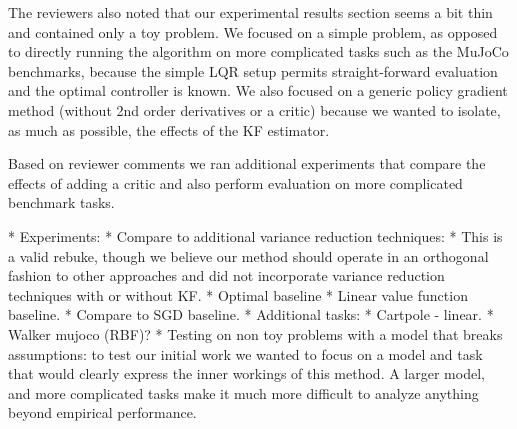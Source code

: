 \documentclass{article}
\begin{document}
		The reviewers also noted that our experimental results section seems a bit thin and contained only a toy problem. 
		We focused on a simple problem, as opposed to directly running the algorithm on more complicated tasks such as the MuJoCo benchmarks, because the simple LQR setup permits straight-forward evaluation and the optimal controller is known.
		We also focused on a generic policy gradient method (without 2nd order derivatives or a critic) because we wanted to isolate, as much as possible, the effects of the KF estimator.
			
		Based on reviewer comments we ran additional experiments that compare the effects of adding a critic and also perform evaluation on more complicated benchmark tasks. 

  * Experiments:
    * Compare to additional variance reduction techniques:
      * This is a valid rebuke, though we believe our method should operate in an orthogonal fashion to other approaches and did not incorporate variance reduction techniques with or without KF.
      * Optimal baseline
      * Linear value function baseline.
    * Compare to SGD baseline.
    * Additional tasks:
      * Cartpole - linear.
      * Walker mujoco (RBF)?
    * Testing on non toy problems with a model that breaks assumptions: to test our initial work we wanted to focus on a model and task that would clearly express the inner workings of this method. A larger model, and more complicated tasks make it much more difficult to analyze anything beyond empirical performance.
  
\end{document}
